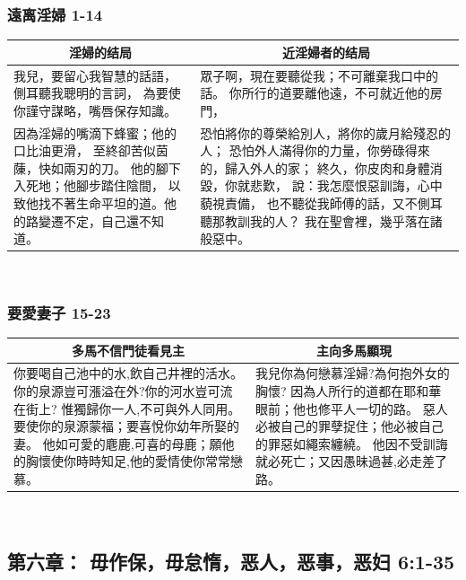 \subsubsection{遠离淫婦 1-14}
\begin{table}[H]
\centering
\begin{tabular}{p{}|p{10.25cm}}\hline\hline
\multicolumn{1}{c|}{淫婦的结局}&\multicolumn{1}{c}{近淫婦者的结局}\\\hline
我兒，要留心我智慧的話語，側耳聽我聰明的言詞，
為要使你謹守謀略，嘴唇保存知識。
&眾子啊，現在要聽從我；不可離棄我口中的話。
你所行的道要離他遠，不可就近他的房門，\\\hline

因為淫婦的嘴滴下蜂蜜；他的口比油更滑，
至終卻苦似茵蔯，快如兩刃的刀。
他的腳下入死地；他腳步踏住陰間，
以致他找不著生命平坦的道。他的路變遷不定，自己還不知道。
&恐怕將你的尊榮給別人，將你的歲月給殘忍的人；
恐怕外人滿得你的力量，你勞碌得來的，歸入外人的家；
終久，你皮肉和身體消毀，你就悲歎，
說：我怎麼恨惡訓誨，心中藐視責備，
也不聽從我師傅的話，又不側耳聽那教訓我的人？
我在聖會裡，幾乎落在諸般惡中。\\\hline
\end{tabular}
\end{table} 


\subsubsection{要愛妻子 15-23}
\begin{table}[H]
\centering
\begin{tabular}{p{9.75cm}|p{8.25cm}}\hline\hline
\multicolumn{1}{c|}{多馬不信門徒看見主}&\multicolumn{1}{c}{主向多馬顯現}\\\hline
你要喝自己池中的水,飲自己井裡的活水。
你的泉源豈可漲溢在外?你的河水豈可流在街上?
惟獨歸你一人,不可與外人同用。
要使你的泉源蒙福；要喜悅你幼年所娶的妻。
他如可愛的麀鹿,可喜的母鹿；願他的胸懷使你時時知足,他的愛情使你常常戀慕。
&我兒你為何戀慕淫婦?為何抱外女的胸懷?
因為人所行的道都在耶和華眼前；他也修平人一切的路。
惡人必被自己的罪孽捉住；他必被自己的罪惡如繩索纏繞。
他因不受訓誨就必死亡；又因愚昧過甚,必走差了路。\\\hline
\end{tabular}
\end{table} 


\subsection{第六章： 毋作保，毋怠惰，恶人，恶事，恶妇 6:1-35}

